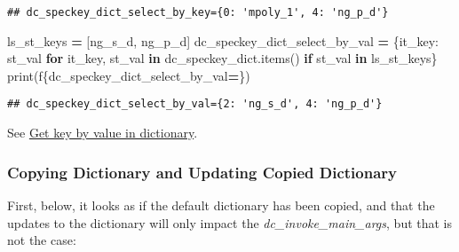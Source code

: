 \documentclass[
]{book}
\newenvironment{Shaded}{\begin{snugshade}}{\end{snugshade}}
\newcommand{\BuiltInTok}[1]{#1}
\newcommand{\ControlFlowTok}[1]{\textcolor[rgb]{0.13,0.29,0.53}{\textbf{#1}}}
\newcommand{\KeywordTok}[1]{\textcolor[rgb]{0.13,0.29,0.53}{\textbf{#1}}}
\newcommand{\NormalTok}[1]{#1}
\newcommand{\OperatorTok}[1]{\textcolor[rgb]{0.81,0.36,0.00}{\textbf{#1}}}
\newcommand{\SpecialCharTok}[1]{\textcolor[rgb]{0.00,0.00,0.00}{#1}}
\newcommand{\SpecialStringTok}[1]{\textcolor[rgb]{0.31,0.60,0.02}{#1}}
\newcommand{\StringTok}[1]{\textcolor[rgb]{0.31,0.60,0.02}{#1}}
\begin{document}
\begin{verbatim}
## dc_speckey_dict_select_by_key={0: 'mpoly_1', 4: 'ng_p_d'}
\end{verbatim}

\begin{Shaded}
\begin{Highlighting}[]
\NormalTok{ls\_st\_keys }\OperatorTok{=}\NormalTok{ [}\StringTok{\textquotesingle{}ng\_s\_d\textquotesingle{}}\NormalTok{, }\StringTok{\textquotesingle{}ng\_p\_d\textquotesingle{}}\NormalTok{]}
\NormalTok{dc\_speckey\_dict\_select\_by\_val }\OperatorTok{=}\NormalTok{ \{it\_key: st\_val }\ControlFlowTok{for}\NormalTok{ it\_key, st\_val }\KeywordTok{in}\NormalTok{ dc\_speckey\_dict.items() }
                                 \ControlFlowTok{if}\NormalTok{ st\_val }\KeywordTok{in}\NormalTok{ ls\_st\_keys\}}
\BuiltInTok{print}\NormalTok{(}\SpecialStringTok{f\textquotesingle{}}\SpecialCharTok{\{}\NormalTok{dc\_speckey\_dict\_select\_by\_val}\OperatorTok{=}\SpecialCharTok{\}}\SpecialStringTok{\textquotesingle{}}\NormalTok{)}
\end{Highlighting}
\end{Shaded}

\begin{verbatim}
## dc_speckey_dict_select_by_val={2: 'ng_s_d', 4: 'ng_p_d'}
\end{verbatim}

See \href{https://stackoverflow.com/questions/8023306/get-key-by-value-in-dictionary}{Get key by value in dictionary}.

\hypertarget{copying-dictionary-and-updating-copied-dictionary}{%
\subsubsection{Copying Dictionary and Updating Copied Dictionary}\label{copying-dictionary-and-updating-copied-dictionary}}

First, below, it looks as if the default dictionary has been copied, and that the updates to the dictionary will only impact the \emph{dc\_invoke\_main\_args}, but that is not the case:
\end{document}
